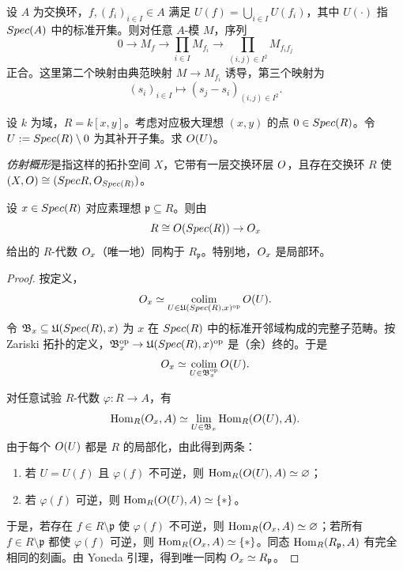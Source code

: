 \begin{lemma}\label{lem:4.2.5}
设 $A$ 为交换环，$f,(f_i)_{i \in I} \in A$ 满足 $U(f) = \bigcup_{i \in I} U(f_i)$，其中 $U(\cdot)$ 指 $Spec(A)$ 中的标准开集。则对任意 $A$-模 $M$，序列
\[
0 \to M_f \to \prod_{i \in I} M_{f_i} \to \prod_{(i,j) \in I^2} M_{f_i f_j}
\]
正合。这里第二个映射由典范映射 $M \to M_{f_i}$ 诱导，第三个映射为
\[
(s_i)_{i \in I} \mapsto (s_j - s_i)_{(i,j) \in I^2}.
\]
\end{lemma}

\begin{exercise}\label{exc:4.2.6}
设 $k$ 为域，$R = k[x,y]$。考虑对应极大理想 $(x,y)$ 的点 $0 \in Spec(R)$。令 $U := Spec(R) \setminus 0$ 为其补开子集。求 $O(U)$。
\end{exercise}

\begin{definition}\label{def:4.2.7}
\emph{仿射概形}是指这样的拓扑空间 $X$，它带有一层交换环层 $O$，且存在交换环 $R$ 使 $(X,O) \cong (Spec R, O_{Spec(R)})$。
\end{definition}

\begin{proposition}\label{prop:4.2.8}
设 $x \in Spec(R)$ 对应素理想 $\mathfrak p \subseteq R$。则由
\[
R \cong O(Spec(R)) \to O_x
\]
给出的 $R$-代数 $O_x$（唯一地）同构于 $R_{\mathfrak p}$。特别地，$O_x$ 是局部环。
\end{proposition}

\begin{proof}
按定义，
\[
O_x \simeq \operatorname*{colim}_{U \in \mathfrak{U}(Spec(R),x)^{\mathrm{op}}} O(U).
\]
令 $\mathfrak{B}_x \subseteq \mathfrak{U}(Spec(R),x)$ 为 $x$ 在 $Spec(R)$ 中的标准开邻域构成的完整子范畴。按 Zariski 拓扑的定义，$\mathfrak{B}_x^{\mathrm{op}} \to \mathfrak{U}(Spec(R),x)^{\mathrm{op}}$ 是（余）终的。于是
\[
O_x \simeq \operatorname*{colim}_{U \in \mathfrak{B}_x^{\mathrm{op}}} O(U).
\]

对任意试验 $R$-代数 $\varphi : R \to A$，有
\[
\operatorname{Hom}_R(O_x, A) \simeq \lim_{U \in \mathfrak{B}_x} \operatorname{Hom}_R(O(U), A).
\]
由于每个 $O(U)$ 都是 $R$ 的局部化，由此得到两条：
\begin{enumerate}[label=(\roman*),leftmargin=2em,itemsep=0.25ex]
  \item 若 $U = U(f)$ 且 $\varphi(f)$ 不可逆，则 $\operatorname{Hom}_R(O(U),A) \simeq \varnothing$；
  \item 若 $\varphi(f)$ 可逆，则 $\operatorname{Hom}_R(O(U),A) \simeq \{*\}$。
\end{enumerate}
于是，若存在 $f \in R \setminus \mathfrak p$ 使 $\varphi(f)$ 不可逆，则 $\operatorname{Hom}_R(O_x,A) \simeq \varnothing$；若所有 $f \in R \setminus \mathfrak p$ 都使 $\varphi(f)$ 可逆，则 $\operatorname{Hom}_R(O_x,A) \simeq \{*\}$。同态 $\operatorname{Hom}_R(R_{\mathfrak p},A)$ 有完全相同的刻画。由 Yoneda 引理，得到唯一同构 $O_x \simeq R_{\mathfrak p}$。
\end{proof}

